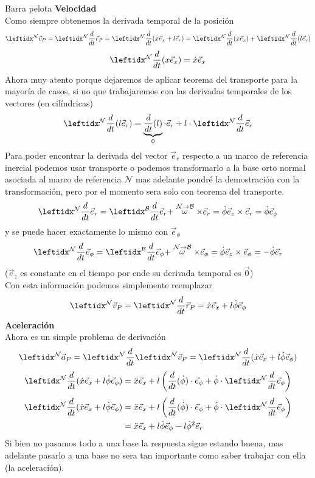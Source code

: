 \begin{solucion}{Barra pelota}
        \textbf{Velocidad}\\
        Como siempre obtenemos la derivada temporal de la posición
        $$\marc{\vec{v}_P}{N}=\der{\vec{r}_{P}}{N}=\der{(x\vec{e}_x+l\vec{e}_r)}{N}=\der{(x\vec{e}_x)}{N}+\der{(l\vec{e}_r)}{N}$$
        $$\der{(x\vec{e}_x)}{N}=\dot x\vec{e}_x$$
        Ahora muy atento porque dejaremos de aplicar teorema del transporte para la mayoría de casos, si no que trabajaremos con las derivadas temporales de los vectores (en cilíndricas) 
        $$\der{(l\vec{e}_r)}{N}=\underbrace{\dfrac{d}{dt} (l)}_{0}\cdot\vec{e}_r+l\cdot\der{\vec{e}_r}{N}$$
        Para poder encontrar la derivada del vector $\vec{e}_r$ respecto a un marco de referencia inercial podemos usar transporte o podemos transformarlo a la base orto normal asociada al marco de referencia $\mathcal{N}$ mas adelante pondré la demostración con la transformación, pero por el momento sera solo con teorema del transporte.
        $$\transport{\vec{e}_r}{N}{B}=\dot\phi\vec{e}_z\times\vec{e}_r=\dot\phi\vec{e}_\phi $$
        y se puede hacer exactamente lo mismo con $\vec{e}_{\phi}$
        $$\transport{\vec{e}_\phi}{N}{B}=\dot\phi\vec{e}_z\times\vec{e}_\phi=-\dot\phi\vec{e}_r$$
        ($\vec{e}_z$ es constante en el tiempo por ende su derivada temporal es $\vec 0$)\\
        Con esta información podemos simplemente reemplazar\\
        $$\marc{\vec{v}_P}{N}=\der{\vec{r}_{P}}{N}=\dot x\vec{e}_x+l\dot\phi\vec{e}_\phi$$
    \textbf{Aceleración}\\
    Ahora es un simple problema de derivación\\
    $$\marc{\vec{a}_P}{N}=\der{}{N}\marc{\vec{v}_P}{N}=\der{}{N}(\dot x\vec{e}_x+l\dot\phi\vec{e}_\phi)$$
    $$\der{}{N}(\dot x\vec{e}_x+l\dot\phi\vec{e}_\phi)=\ddot x\vec{e}_x+l\left(\dfrac{d}{dt}(\dot\phi)\cdot \vec{e}_\phi+\dot\phi\cdot\der{\vec{e}_\phi}{N}\right)$$
    \begin{align*}
        \der{}{N}(\dot x\vec{e}_x+l\dot\phi\vec{e}_\phi)&=\ddot x\vec{e}_x+l\left(\dfrac{d}{dt}(\dot\phi)\cdot \vec{e}_\phi+\dot\phi\cdot\der{\vec{e}_\phi}{N}\right)\\
        &=\ddot x\vec{e}_x+l\ddot\phi\vec{e}_\phi-l\dot\phi^2\vec{e}_r
    \end{align*}
    Si bien no pasamos todo a una base la respuesta sigue estando buena, mas adelante pasarlo a una base no sera tan importante como saber trabajar con ella (la aceleración).



\end{solucion}
